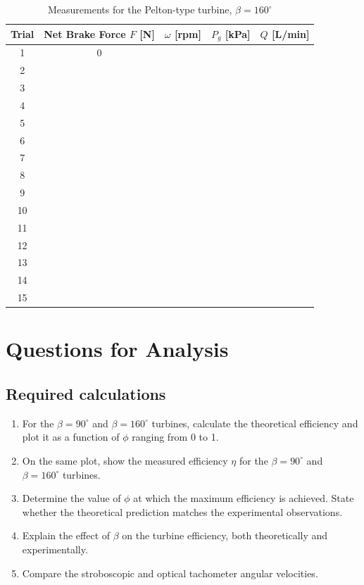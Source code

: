 \documentclass[12pt,letterpaper]{article}
\begin{document}
\begin{table}[H]
\centering
\caption{Measurements for the Pelton-type turbine, \(\beta=160^\circ\)}
\label{tab:main-data-160}
\begin{tabular}{ccccc}
\toprule
Trial & Net Brake Force \(F\) [N] & \(\omega\) [rpm] & \(P_g\) [kPa] & \(Q\) [L/min] \\
\midrule
1 & 0 & & & \\
2 & & & & \\
3 & & & & \\
4 & & & & \\
5 & & & & \\
6 & & & & \\
7 & & & & \\
8 & & & & \\
9 & & & & \\
10 & & & & \\
11 & & & & \\
12 & & & & \\
13 & & & & \\
14 & & & & \\
15 & & & & \\
\bottomrule
\end{tabular}
\end{table}

\section{Questions for Analysis}

\subsection*{Required calculations}
\begin{enumerate}[leftmargin=*, label=\arabic*.]
    \item For the \(\beta = 90^\circ\) and \(\beta = 160^\circ\) turbines, calculate the theoretical efficiency and plot it as a function of \(\phi\) ranging from 0 to 1.
    \item On the same plot, show the measured efficiency \(\eta\) for the \(\beta = 90^\circ\) and \(\beta = 160^\circ\) turbines.
    \item Determine the value of \(\phi\) at which the maximum efficiency is achieved. State whether the theoretical prediction matches the experimental observations.
    \item Explain the effect of \(\beta\) on the turbine efficiency, both theoretically and experimentally.
    \item Compare the stroboscopic and optical tachometer angular velocities.
\end{enumerate}
\end{document}
